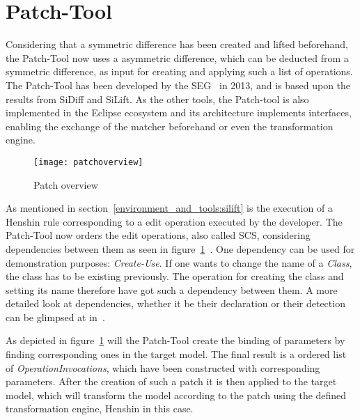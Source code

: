 \section{Patch-Tool}\label{environment_and_tools:patchtool}
Considering that a symmetric difference has been created and lifted beforehand,
the Patch-Tool now uses a asymmetric difference, which can be deducted from a
symmetric difference, as input for creating and applying such a list of
operations. The Patch-Tool has been developed by the \ac{SEG}~\cite{SEGURL} in
2013, and is based upon the results from SiDiff and SiLift. As the other tools,
the Patch-tool is also implemented in the Eclipse ecosystem and its architecture
implements interfaces, enabling the exchange of the matcher beforehand
or even the transformation engine. 

 \begin{figure}[h!]
\begin{center}
\texttt{[image: patchoverview]}\\
\end{center}
\caption{Patch overview~\cite{kochpatchen}}
\label{patchoverview}
\end{figure}

As mentioned in section~\ref{environment_and_tools:silift} is the execution of
a Henshin rule corresponding to a edit operation executed by the developer. The
Patch-Tool now orders the edit operations, also called \ac{SCS}, considering
dependencies between them as seen in
figure~\ref{patchoverview}~\cite{modelevolutionlifting}. One dependency
can be used for demonstration purposes: \textit{Create-Use}. If one wants to
change the name of a \textit{Class}, the class has to be existing previously.
The operation for creating the class and setting its name therefore have got such
a dependency between them. A more detailed look at dependencies, whether it be
their declaration or their detection can be glimpsed
at in~\cite{modelevolutionlifting}.

As depicted in figure~\ref{patchoverview} will the Patch-Tool create the
binding of parameters by finding corresponding ones in the target model.
The final result is a ordered list of \textit{OperationInvocations}, which have
been constructed with corresponding parameters. After the creation of such a
patch it is then applied to the target model, which will transform the model
according to the patch using the defined transformation engine, Henshin in this
case.
